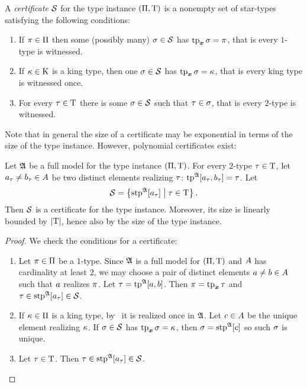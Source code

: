 \begin{definition}
A \emph{certificate} $\mathcal{S}$ for the type instance $(\Pi,\mathrm{T})$ is a
nonempty set of star-types satisfying the following conditions:
\begin{enumerate}
  \item\label{cond:cert-1} If $\pi \in \Pi$ then some (possibly many) $\sigma
  \in \mathcal{S}$ has $\operatorname{tp}_{\bm{x}}\sigma = \pi$, that is every $1$-type is witnessed.
  \item\label{cond:cert-2} If $\kappa \in \mathrm{K}$ is a king type, then one $\sigma
  \in \mathcal{S}$ has $\operatorname{tp}_{\bm{x}}\sigma = \kappa$, that is every king type is witnessed once.
  \item\label{cond:cert-3} For every $\tau \in \mathrm{T}$ there is some
  $\sigma\in\mathcal{S}$ such that $\tau \in \sigma$, that is every $2$-type is
  witnessed.
\end{enumerate}
\end{definition}
Note that in general the size of a certificate may be exponential in terms of
the size of the type instance. However, polynomial certificates exist:
\begin{lemma}\label{lem:cert-extract}
Let $\mathfrak{A}$ be a full model for the type instance $(\Pi,\mathrm{T})$.
For every $2$-type $\tau \in \mathrm{T}$,
let $a_\tau \neq b_\tau \in A$ be two distinct elements realizing
$\tau$: $\operatorname{tp}^{\mathfrak{A}}[a_\tau,b_\tau] = \tau$.
Let 
\[
  \mathcal{S} = \left\{\operatorname{stp}^{\mathfrak{A}}[a_\tau]\mathrel{}\middle|\mathrel{}\tau\in\mathrm{T}\right\}.
\]
Then $\mathcal{S}$ is a certificate for the type instance. Moreover, its size is
linearly bounded by $\left|\mathrm{T}\right|$, hence also by the size of the type instance.
\end{lemma}
\begin{proof}
We check the conditions for a certificate:
\begin{enumerate}
  \item Let $\pi \in \Pi$ be a $1$-type. Since $\mathfrak{A}$ is a full
  model for $(\Pi,\mathrm{T})$ and $A$ has cardinality at least $2$, we may
  choose a pair of distinct elements $a\neq b\in A$ such that $a$
  realizes $\pi$. Let $\tau = \operatorname{tp}^{\mathfrak{A}}[a,b]$. Then $\pi = \operatorname{tp}_{\bm{x}}\tau$
  and $\tau \in \operatorname{stp}^{\mathfrak{A}}[a_\tau] \in \mathcal{S}$.
  \item If $\kappa \in \Pi$ is a king type, by~ it
  is realized once in $\mathfrak{A}$.
  Let $c \in A$ be the unique element realizing $\kappa$.
  If $\sigma \in \mathcal{S}$ has $\operatorname{tp}_{\bm{x}}\sigma = \kappa$, then $\sigma = \operatorname{stp}^{\mathfrak{A}}[c]$
  so such $\sigma$ is unique.
  \item Let $\tau \in \mathrm{T}$. Then $\tau \in \operatorname{stp}^{\mathfrak{A}}[a_\tau] \in
  \mathcal{S}$.
\end{enumerate}
\end{proof}

